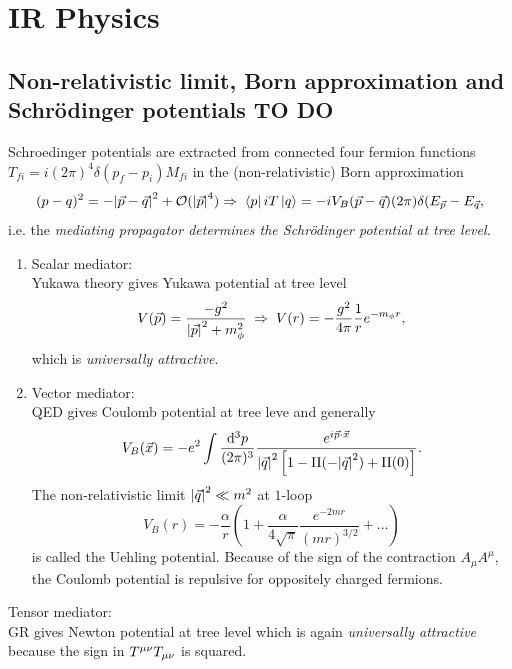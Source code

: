 \section{IR Physics}
\subsection{Non-relativistic limit, Born approximation and Schrödinger potentials TO DO}
\begin{mybox}{}
	Schroedinger potentials are extracted from connected four fermion functions$T_{fi} = i(2 \pi)^4 \delta(p_f-p_i) M_{fi}$ in the (non-relativistic) Born approximation
	\begin{equation}
	(p-q)^2 = - \abs{\vec{p}-\vec{q}}^2 + \mathcal{O}(\abs{\vec{p}}^4) \Rightarrow\; \bra{p}iT\ket{q}=-iV_B(\vec{p}-\vec{q}) (2 \pi) \delta(E_{\vec{p}} -E_{\vec{q}},
	\end{equation}
	i.e. the \emph{mediating propagator determines the Schrödinger potential at tree level.}\\
	\begin{enumerate}
		\item 
		Scalar mediator: \\
		Yukawa theory gives Yukawa potential at tree level
		\begin{equation}
		V(\vec{p})=\frac{-g^2}{\abs{\vec{p}}^2+m^2_\phi}\;\Rightarrow\; V(r)=-\frac{g^2}{4\pi } \frac{1}{r} e^{-m_\phi r},
		\end{equation}
		which is \emph{universally attractive}.\\
		\item Vector mediator:\\
		QED gives Coulomb potential at tree leve and generally 
		\begin{equation}
		V_B(\vec{x}) = -e^2 \int \frac{\mathrm{d}^3 p}{(2 \pi)^3} \frac{e^{i \vec{p}\cdot \vec{x}}}{\abs{\vec{q}}^2 \left[1 -\Pi(-\abs{\vec{q}}^2) + \Pi(0)\right]}.
		\end{equation}
		The non-relativistic limit $\abs{\vec{q}}^2 \ll m^2$ at $1$-loop
		\begin{equation}
		V_B(r)= -\frac{\alpha}{r} \left(1+\frac{\alpha}{4\sqrt{\pi} } \frac{e^{-2mr}}{(mr)^{3/2}} + \dots\right)
		\end{equation}
		is called the Uehling potential. Because of the sign of the contraction $A_\mu A^\mu$, the Coulomb potential is repulsive for oppositely charged fermions.
	\end{enumerate}
	
\end{mybox}
Tensor mediator:\\
GR gives Newton potential at tree level which is again \emph{universally attractive} because the sign in $T^{\mu \nu}T_{\mu \nu}$ is squared.

